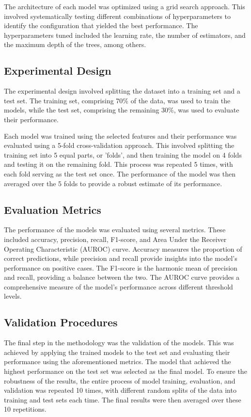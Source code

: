 \documentclass[conference]{IEEEtran}
\begin{document}
The architecture of each model was optimized using a grid search approach. This involved systematically testing different combinations of hyperparameters to identify the configuration that yielded the best performance. The hyperparameters tuned included the learning rate, the number of estimators, and the maximum depth of the trees, among others.

\subsection{Experimental Design}
The experimental design involved splitting the dataset into a training set and a test set. The training set, comprising 70\% of the data, was used to train the models, while the test set, comprising the remaining 30\%, was used to evaluate their performance.

Each model was trained using the selected features and their performance was evaluated using a 5-fold cross-validation approach. This involved splitting the training set into 5 equal parts, or 'folds', and then training the model on 4 folds and testing it on the remaining fold. This process was repeated 5 times, with each fold serving as the test set once. The performance of the model was then averaged over the 5 folds to provide a robust estimate of its performance.

\subsection{Evaluation Metrics}
The performance of the models was evaluated using several metrics. These included accuracy, precision, recall, F1-score, and Area Under the Receiver Operating Characteristic (AUROC) curve. Accuracy measures the proportion of correct predictions, while precision and recall provide insights into the model's performance on positive cases. The F1-score is the harmonic mean of precision and recall, providing a balance between the two. The AUROC curve provides a comprehensive measure of the model's performance across different threshold levels.

\subsection{Validation Procedures}
The final step in the methodology was the validation of the models. This was achieved by applying the trained models to the test set and evaluating their performance using the aforementioned metrics. The model that achieved the highest performance on the test set was selected as the final model. To ensure the robustness of the results, the entire process of model training, evaluation, and validation was repeated 10 times, with different random splits of the data into training and test sets each time. The final results were then averaged over these 10 repetitions.
\end{document}
